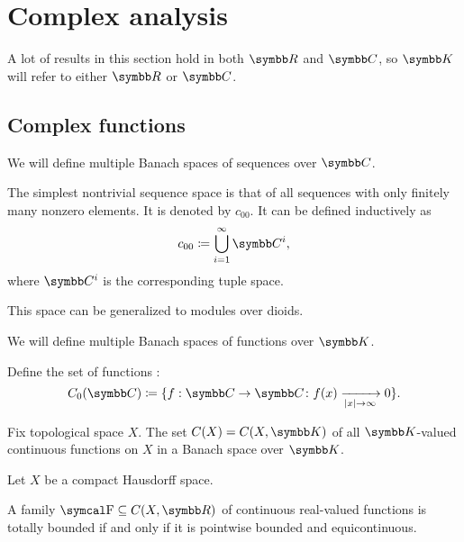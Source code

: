 \section{Complex analysis}\label{sec:complex_analysis}

A lot of results in this section hold in both \( \R \) and \( \C \), so \( \K \) will refer to either \( \R \) or \( \C \).

\subsection{Complex functions}\label{subsec:complex_functions}

\begin{definition}\label{def:sequence_spaces}
  We will define multiple Banach spaces of sequences over \( \C \).

  \begin{defenum}
     The simplest nontrivial sequence space is that of all sequences with only finitely many nonzero elements. It is denoted by \( c_{00} \). It can be defined inductively as
    \begin{equation*}
      c_{00} \coloneqq \bigcup_{i=1}^\infty \C^i,
    \end{equation*}
    where \( \C^i \) is the corresponding tuple space.

    This space can be generalized to modules over dioids.
  \end{defenum}
\end{definition}

\begin{definition}\label{def:function_spaces}
  We will define multiple Banach spaces of functions over \( \K \).

  \begin{defenum}
     Define the set of functions :
    \begin{equation*}
      C_0(\C) \coloneqq \{ f: \C \to \C \colon f(x) \xrightarrow[\Abs{x} \to \infty]{} 0 \}.
    \end{equation*}

     Fix topological space \( X \). The set \( C(X) = C(X, \K) \) of all \( \K \)-valued continuous functions on \( X \) in a Banach space over \( \K \).
  \end{defenum}
\end{definition}

\begin{theorem}\label{thm:arzela_ascoli}\cite[corollary 10.49]{Knapp2016BAlg}
  Let \( X \) be a compact Hausdorff space.

  A family \( \F \subseteq C(X, \R) \) of continuous real-valued functions is totally bounded if and only if it is pointwise bounded and equicontinuous.
\end{theorem}
